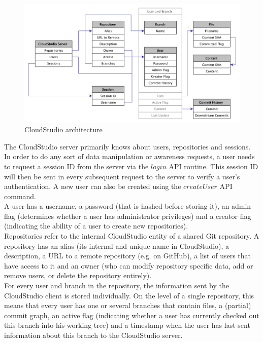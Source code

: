 \begin{figure}[h!]
  \centering
      \includegraphics[width=1\textwidth]{entities}
  \caption{CloudStudio architecture}
  \label{fig:entities}
\end{figure}


The CloudStudio server primarily knows about users, repositories and sessions. \\

In order to do any sort of data manipulation or awareness requests, a user needs to request a session ID from the server via the $login$ API routine. This session ID will then be sent in every subsequent request to the server to verify a user's authentication. A new user can also be created using the $createUser$ API command. \\

A user has a username, a password (that is hashed before storing it), an admin flag (determines whether a user has administrator privileges) and a creator flag (indicating the ability of a user to create new repositories). \\

Repositories refer to the internal CloudStudio entity of a shared Git repository. A repository has an alias (its internal and unique name in CloudStudio), a description, a URL to a remote repository (e.g. on GitHub), a list of users that have access to it and an owner (who can modify repository specific data, add or remove users, or delete the repository entirely). \\

For every user and branch in the repository, the information sent by the CloudStudio client is stored individually. On the level of a single repository, this means that every user has one or several branches that contain files, a (partial) commit graph, an active flag (indicating whether a user has currently checked out this branch into his working tree) and a timestamp when the user has last sent information about this branch to the CloudStudio server. \\

